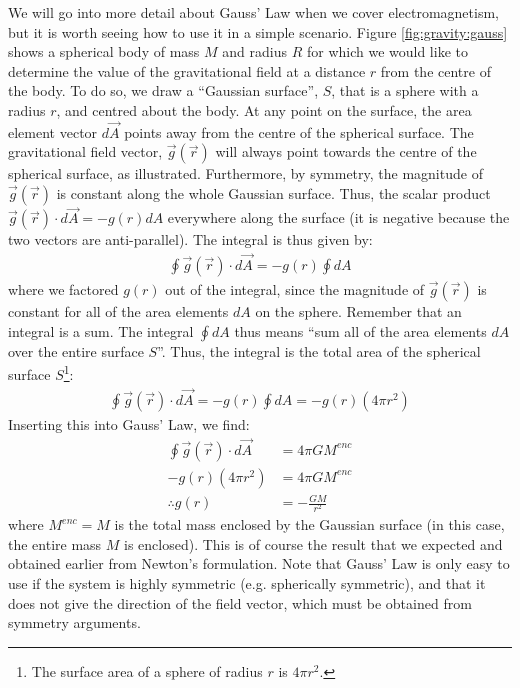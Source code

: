 We will go into more detail about Gauss' Law when we cover electromagnetism, but it is worth seeing how to use it in a simple scenario. Figure \ref{fig:gravity:gauss} shows a spherical body of mass $M$ and radius $R$ for which we would like to determine the value of the gravitational field at a distance $r$ from the centre of the body.
To do so, we draw a ``Gaussian surface'', $S$, that is a sphere with a radius $r$, and centred about the body. At any point on the surface, the area element vector $d\vec A$ points away from the centre of the spherical surface. The gravitational field vector, $\vec g(\vec r)$ will always point towards the centre of the spherical surface, as illustrated. Furthermore, by symmetry, the magnitude of $\vec g(\vec r)$ is constant along the whole Gaussian surface. Thus, the scalar product $\vec g(\vec r) \cdot d\vec A=-g(r)dA$ everywhere along the surface (it is negative because the two vectors are anti-parallel). The integral is thus given by:
\begin{align*}
\oint \vec g(\vec r) \cdot d\vec A = -g(r)\oint dA 
\end{align*}
where we factored $g(r)$ out of the integral, since the magnitude of $\vec g(\vec r)$ is constant for all of the area elements $dA$ on the sphere. Remember that an integral is a sum. The integral $\oint dA$ thus means ``sum all of the area elements $dA$ over the entire surface $S$''. Thus, the integral is the total area of the spherical surface $S$\footnote{The surface area of a sphere of radius $r$ is $4\pi r^2$.}:
\begin{align*}
\oint \vec g(\vec r) \cdot d\vec A = -g(r)\oint dA =-g(r)(4\pi r^2)
\end{align*}
Inserting this into Gauss' Law, we find:
\begin{align*}
\oint \vec g(\vec r) \cdot d\vec A &= 4\pi G M^{enc}\\
-g(r)(4\pi r^2) &= 4\pi G M^{enc}\\
\therefore g(r) &= - \frac{GM}{r^2}
\end{align*}
where $M^{enc}=M$ is the total mass enclosed by the Gaussian surface (in this case, the entire mass $M$ is enclosed). This is of course the result that we expected and obtained earlier from Newton's formulation. Note that Gauss' Law is only easy to use if the system is highly symmetric (e.g. spherically symmetric), and that it does not give the direction of the field vector, which must be obtained from symmetry arguments. 
